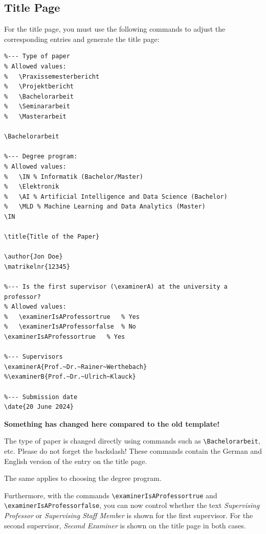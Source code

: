 \documentclass[pdftex,a4paper]{scrartcl}
\begin{document}
\subsection{Title Page}
\label{sec:titleseite}
For the title page, you must use the following commands to adjust the corresponding
entries and generate the title page:

\begin{verbatim}
%--- Type of paper
% Allowed values:
%   \Praxissemesterbericht
%   \Projektbericht
%   \Bachelorarbeit
%   \Seminararbeit
%   \Masterarbeit

\Bachelorarbeit

%--- Degree program:
% Allowed values:
%   \IN % Informatik (Bachelor/Master)
%   \Elektronik
%   \AI % Artificial Intelligence and Data Science (Bachelor)
%   \MLD % Machine Learning and Data Analytics (Master)
\IN

\title{Title of the Paper}

\author{Jon Doe}
\matrikelnr{12345}

%--- Is the first supervisor (\examinerA) at the university a professor?
% Allowed values:
%   \examinerIsAProfessortrue   % Yes
%   \examinerIsAProfessorfalse  % No
\examinerIsAProfessortrue   % Yes

%--- Supervisors
\examinerA{Prof.~Dr.~Rainer~Werthebach}
%\examinerB{Prof.~Dr.~Ulrich~Klauck}

%--- Submission date
\date{20 June 2024}
\end{verbatim}

\begin{warningblock}
\textbf{Something has changed here compared to the old template!}

The type of paper is changed directly using commands such as
\texttt{\textbackslash Bachelorarbeit}, etc.
Please do not forget the backslash!
These commands contain the German and English version of the entry
on the title page.

The same applies to choosing the degree program.

Furthermore, with the commands
\texttt{\textbackslash examinerIsAProfessor\color{blue}true} and
\texttt{\textbackslash examinerIsAProfessor\color{blue}false}, you can now control
whether the text \textit{Supervising Professor} or
\textit{Supervising Staff Member} is shown for the first supervisor.
For the second supervisor, \textit{Second Examiner} is shown on the title page in both cases.
\end{warningblock}
\end{document}
